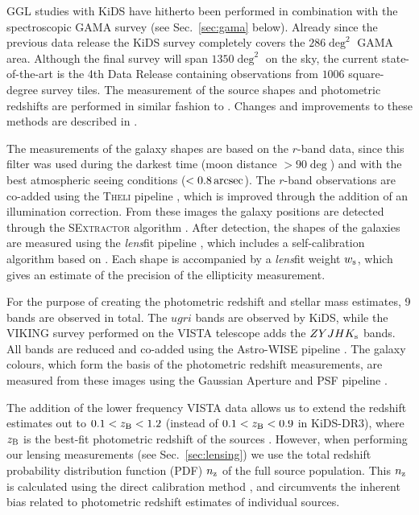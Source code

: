 \documentclass[usenatbib]{mnras}
\newcommand{\as}{\, {\rm arcsec}}
\newcommand{\un}[1]{_{\rm #1}}
\begin{document}
GGL studies with KiDS have hitherto been performed in combination with the spectroscopic GAMA survey (see Sec.~\ref{sec:gama} below). Already since the previous data release \cite[KiDS-DR3,][]{dejong2017} the KiDS survey completely covers the $286 \deg^2$ GAMA area. Although the final survey will span $1350 \deg^2$ on the sky, the current state-of-the-art is the 4th Data Release \cite[KiDS-DR4,][]{kuijken2019} containing observations from $1006$ square-degree survey tiles. The measurement of the source shapes and photometric redshifts are performed in similar fashion to \cite{dejong2017}. Changes and improvements to these methods are described in \cite{kuijken2019}. 

The measurements of the galaxy shapes are based on the $r$-band data, since this filter was used during the darkest time (moon distance $> 90 \deg$) and with the best atmospheric seeing conditions ($<0.8 \as$). The $r$-band observations are co-added using the {\scshape Theli} pipeline \cite[]{erben2013}, which is improved through the addition of an illumination correction. From these images the galaxy positions are detected through the {\scshape SExtractor} algorithm \cite[]{bertin1996}. After detection, the shapes of the galaxies are measured using the \emph{lens}fit pipeline \cite[]{miller2007,miller2013}, which includes a self-calibration algorithm based on \cite{fenechconti2017}. Each shape is accompanied by a \emph{lens}fit weight $w\un{s}$, which gives an estimate of the precision of the ellipticity measurement.

For the purpose of creating the photometric redshift and stellar mass estimates, 9 bands are observed in total. The $ugri$ bands are observed by KiDS, while the VIKING survey \cite[]{edge2013} performed on the VISTA telescope adds the $ZYJHK\un{s}$ bands. All bands are reduced and co-added using the Astro-WISE pipeline \cite[AW,][]{mcfarland2013}. The galaxy colours, which form the basis of the photometric redshift measurements, are measured from these images using the Gaussian Aperture and PSF pipeline \cite[GAaP,][]{kuijken2008,kuijken2015}.

The addition of the lower frequency VISTA data allows us to extend the redshift estimates out to $0.1<z\un{B}<1.2$ (instead of $0.1<z\un{B}<0.9$ in KiDS-DR3), where $z\un{B}$ is the best-fit photometric redshift of the sources \cite[]{benitez2000,hildebrandt2012}. However, when performing our lensing measurements (see Sec.~\ref{sec:lensing}) we use the total redshift probability distribution function (PDF) $n\un{z}$ of the full source population. This $n\un{z}$ is calculated using the direct calibration method \cite[DIR,][]{hildebrandt2017}, and circumvents the inherent bias related to photometric redshift estimates of individual sources.
\end{document}
